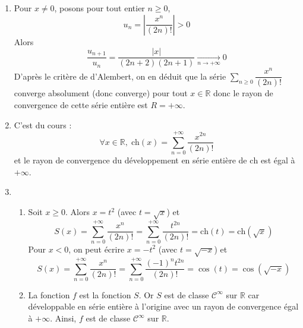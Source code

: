 \documentclass[a4paper,10pt]{report}
\newcommand{\Sum}[2]{\ensuremath{\textstyle{\sum\limits_{#1}^{#2}}}}
\begin{document}
\corr \begin{enumerate}
\item Pour $x \neq 0$, posons  pour tout entier $n \geq 0$,
 $$u_n  = \left\vert \dfrac{x^n }{(2n)!} \right\vert > 0$$
Alors
$$ \dfrac{u_{n+1}}{u_n} = \dfrac{ \vert x \vert }{(2n+2)(2n+1)} \underset{n \rightarrow + \infty}{\longrightarrow} 0$$
D'après le critère de d'Alembert, on en déduit que la série $\Sum{n \geq 0}{} {\dfrac{{x^n }}{{(2n)!}}} $ converge absolument (donc converge) pour tout $x \in \mathbb{R}$ donc le rayon de convergence de cette série entière est $R =  + \infty $.
\item C'est du cours :
$$\forall x\in \mathbb{R} , \; \textrm{ch} (x) = \displaystyle\sum\limits_{n = 0}^{ + \infty } {\dfrac{{x^{2n} }}{{(2n)!}}} $$ 
et le rayon de convergence du développement en série entière de $\textrm{ch}$  est égal à $ + \infty $.
\item 
\begin{enumerate}
\item Soit $x \geq 0$. Alors $x= t^2$ (avec $t = \sqrt{x}$) et 
$$S(x) = \displaystyle\sum\limits_{n = 0}^{ + \infty } {\dfrac{{x^n }}{{(2n)!}}}  = \displaystyle\sum\limits_{n = 0}^{ + \infty } {\dfrac{{t^{2n} }}{{(2n)!}}}  = \textrm{ch} (t) = \textrm{ch}( \sqrt x) $$
Pour $x < 0$, on peut écrire $x =  - t^2 $ (avec $t=\sqrt{-x}$) et 
$$S(x) = \displaystyle\sum\limits_{n = 0}^{ + \infty } {\dfrac{{x^n }}{{(2n)!}}}  = \displaystyle\sum\limits_{n = 0}^{ + \infty } {\dfrac{{( - 1)^n t^{2n} }}{{(2n)!}}}  = \cos (t) = \cos (\sqrt { - x}) $$
\item La fonction $f$ est la fonction $S$. Or $S$ est  de classe $\mathcal{C}^\infty $ sur $\mathbb{R}$ car développable en série entière à l'origine avec un rayon de convergence égal à $+\infty$. Ainsi, $f$ est  de classe $\mathcal{C}^\infty  $ sur $\mathbb{R}$.
\end{enumerate}
\end{enumerate}
\end{document}
